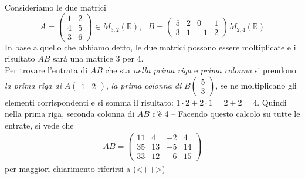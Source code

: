 \begin{esempio}
  Consideriamo le due matrici
  \begin{equation*}
    A=
    \begin{pmatrix}
      1 &2\\
      4 & 5\\
      3 & 6
    \end{pmatrix} \in M_{3,2}(\mathbb{R}), \text{ } B=
    \begin{pmatrix}
      5 & 2 & 0& 1\\
      3 & 1 &-1 &2
    \end{pmatrix} M_{2,4}(\mathbb{R})
  \end{equation*}
  In base a quello che abbiamo detto, le due matrici possono essere moltiplicate e il risultato
  $AB$ sarà una matrice 3 per 4.\\
  Per trovare l'entrata di $AB$ che sta \textit{nella prima riga} e \textit{prima colonna} si
  prendono \emph{la prima riga di} $A
  \begin{pmatrix}
    1 & 2
  \end{pmatrix}
  $, \emph{la prima colonna di} $B
  \begin{pmatrix}
    5\\
    3
  \end{pmatrix}
  $, se ne moltiplicano gli elementi corrispondenti e si somma il risultato:
  $1\cdot 2 + 2\cdot 1=2+2=4$. Quindi nella prima riga, seconda colonna di $AB$ c'è
  4 -- Facendo questo calcolo su tutte le entrate, si vede che
  \begin{eqnarray*}
    AB=
    \begin{pmatrix}
      11 &4 & -2 &4\\
      35 & 13 & -5 & 14\\
      33 & 12 & -6 & 15
    \end{pmatrix}
  \end{eqnarray*}
  per maggiori chiarimento riferirsi a (<++>)
\end{esempio}
